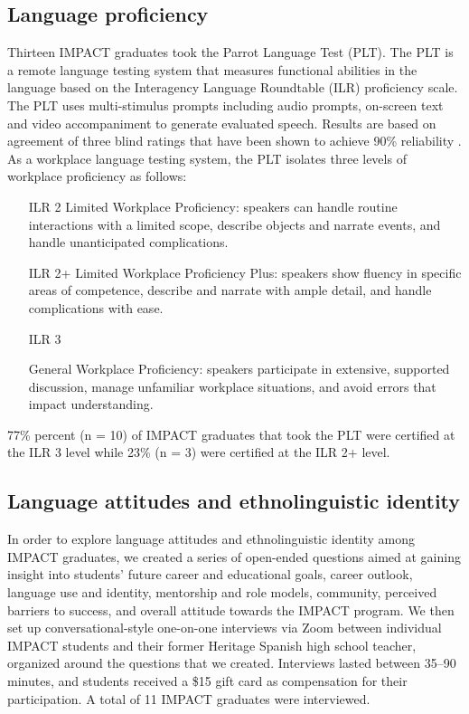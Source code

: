 \documentclass[output=paper]{langscibook}
\begin{document}
\subsection{Language proficiency}

Thirteen IMPACT graduates took the Parrot Language Test (PLT). The PLT is a remote language testing system that measures functional abilities in the language based on the Interagency Language Roundtable (ILR) proficiency scale. The PLT uses multi-stimulus prompts including audio prompts, on-screen text and video accompaniment to generate evaluated speech. Results are based on agreement of three blind ratings that have been shown to achieve 90\% reliability \citep{ParrotND}. As a workplace language testing system, the PLT isolates three levels of workplace proficiency as follows:

\begin{itemize}[align=left, leftmargin=1.5cm, labelwidth=1.2cm]
\item[ILR 2] Limited Workplace Proficiency: speakers can handle routine interactions with a limited scope, describe objects and narrate events, and handle unanticipated complications.
\item[ILR 2+] Limited Workplace Proficiency Plus: speakers show fluency in specific areas of competence, describe and narrate with ample detail, and handle complications with ease.
\item[ILR 3] \begin{sloppypar}General Workplace Proficiency: speakers participate in extensive, sup\-ported discussion, manage unfamiliar workplace situations, and avoid errors that impact understanding.\end{sloppypar}
\end{itemize}

77\% percent (n = 10) of IMPACT graduates that took the PLT were certified at the ILR 3 level while 23\% (n = 3) were certified at the ILR 2+ level.

\subsection{Language attitudes and ethnolinguistic identity}

In order to explore language attitudes and ethnolinguistic identity among IMPACT graduates, we created a series of open-ended questions aimed at gaining insight into students’ future career and educational goals, career outlook, language use and identity, mentorship and role models, community, perceived barriers to success, and overall attitude towards the IMPACT program. We then set up conversational-style one-on-one interviews via Zoom between individual IMPACT students and their former Heritage Spanish high school teacher, organized around the questions that we created. Interviews lasted between 35--90 minutes, and students received a \$15 gift card as compensation for their participation. A total of 11 IMPACT graduates were interviewed.
\end{document}
